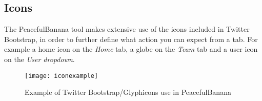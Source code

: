 \subsection{Icons}
The PeacefulBanana tool makes extensive use of the icons included in Twitter Bootstrap, in order to further define what action you can expect from a tab. For example a home icon on the \textit{Home} tab, a globe on the \textit{Team} tab and a user icon on the \textit{User dropdown}.
\begin{figure}[h!]
\label{iconexample}
\centering
	\texttt{[image: iconexample]}
\caption{Example of Twitter Bootstrap/Glyphicons use in PeacefulBanana}
\end{figure}
